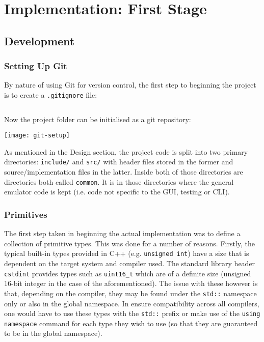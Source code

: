\section{Implementation: First Stage} %

\subsection{Development}
    \subsubsection{Setting Up Git}
        By nature of using Git for version control, the first step to beginning the project is to create a \texttt{.gitignore} file:

        \inputminted{html}{code/initial/.gitignore}

        Now the project folder can be initialised as a git repository:

        \texttt{[image: git-setup]}

        As mentioned in the Design section, the project code is split into two primary directories: \texttt{include/} and \texttt{src/} with header files stored in the former and source/implementation files in the latter. Inside both of those directories are directories both called \texttt{common}. It is in those directories where the general emulator code is kept (i.e. code not specific to the GUI, testing or CLI).

    \subsubsection{Primitives}

        The first step taken in beginning the actual implementation was to define a collection of primitive types. This was done for a number of reasons. Firstly, the typical built-in types provided in C++ (e.g. \texttt{unsigned int}) have a size that is dependent on the target system and compiler used. The standard library header \texttt{cstdint} provides types such as \texttt{uint16\_t} which are of a definite size (unsigned 16-bit integer in the case of the aforementioned). The issue with these however is that, depending on the compiler, they may be found under the \texttt{std::} namespace only or also in the global namespace. In ensure compatibility across all compilers, one would have to use these types with the \texttt{std::} prefix or make use of the \texttt{using namespace} command for each type they wish to use (so that they are guaranteed to be in the global namespace).

